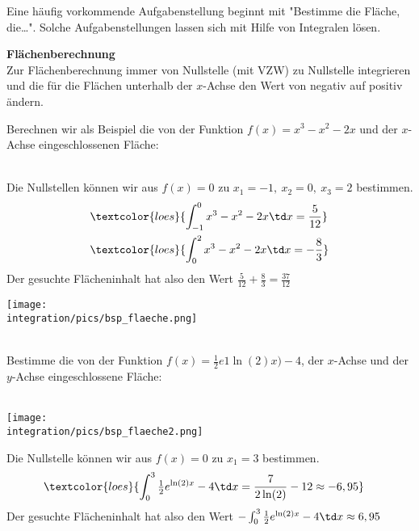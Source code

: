 Eine häufig vorkommende Aufgabenstellung beginnt mit "Bestimme die Fläche, die\dots". Solche Aufgabenstellungen lassen sich mit Hilfe von Integralen lösen. 
\begin{tcolorbox}
	\textbf{Flächenberechnung}\\
	\textcolor{loestc}{Zur Flächenberechnung immer von Nullstelle (mit VZW) zu Nullstelle integrieren und die für die Flächen unterhalb der \(x\)-Achse den Wert von negativ auf positiv ändern.\\}
\end{tcolorbox}
Berechnen wir als Beispiel die von der Funktion \(f(x)=x^3-x^2-2x\) und der \(x\)-Achse eingeschlossenen Fläche:\\ \\
\begin{minipage}{\textwidth}
	\begin{minipage}{.59\textwidth}\raggedright
		\textcolor{loes}{Die Nullstellen können wir aus \(f(x)=0\) zu \(x_1=-1,\ x_2=0,\ x_3=2\) bestimmen.}
		\begin{align*}
			&\textcolor{loes}{\int_{-1}^0 x^3-x^2-2x\td x=\frac{5}{12}}\\		
			&\textcolor{loes}{\int_{0}^2 x^3-x^2-2x\td x=-\frac{8}{3}}
		\end{align*}	
		\textcolor{loes}{Der gesuchte Flächeninhalt hat also den Wert \(\frac{5}{12}+\frac{8}{3}=\frac{37}{12}\)}	
	\end{minipage}
	\begin{minipage}{.36\textwidth}
		\texttt{[image: \\integration/pics/bsp\_flaeche.png]}
	\end{minipage}
\end{minipage}\vspace{\baselineskip}\\
Bestimme die von der Funktion  \(f(x)=\frac{1}{2}e1{\ln(2)x})-4\), der \(x\)-Achse und der \(y\)-Achse eingeschlossene Fläche:\\ \\
\begin{minipage}{\textwidth}
	\begin{minipage}{.36\textwidth}
		\texttt{[image: \\integration/pics/bsp\_flaeche2.png]}
	\end{minipage}
	\begin{minipage}{.59\textwidth}\raggedright
		\textcolor{loes}{Die Nullstelle können wir aus \(f(x)=0\) zu \(x_1=3\) bestimmen.}
		\begin{align*}
			&\textcolor{loes}{\int_{0}^3 \tfrac{1}{2}e^{\ln(2)x}-4\td x=\frac{7}{2\ln(2)}-12\approx -6,95}
		\end{align*}	
		\textcolor{loes}{Der gesuchte Flächeninhalt hat also den Wert \(-\int_{0}^3 \tfrac{1}{2}e^{\ln(2)x}-4\td x\approx 6,95\)}	
	\end{minipage}
\end{minipage}\vspace{\baselineskip}\\
\newpage

